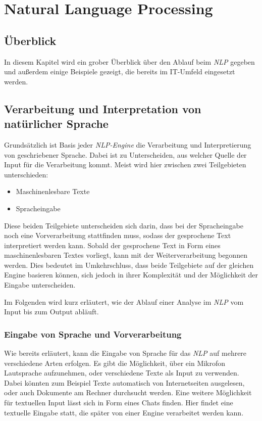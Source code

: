 \chapter{Natural Language Processing}
\label{cha:NaturalLanguageProcessing}
\section{Überblick}
In diesem Kapitel wird ein grober Überblick über den Ablauf beim \textit{NLP} gegeben und außerdem einige Beispiele gezeigt, die bereits im IT-Umfeld eingesetzt werden. 

\section{Verarbeitung und Interpretation von natürlicher Sprache}
\label{sec:applications-natural-language-processing}
Grundsätzlich ist Basis jeder \textit{NLP-Engine} die Verarbeitung und Interpretierung von geschriebener Sprache. Dabei ist zu Unterscheiden, aus welcher Quelle der Input für die Verarbeitung kommt. Meist wird hier zwischen zwei Teilgebieten unterschieden:

\begin{itemize}
	\item Maschinenlesbare Texte
	\item Spracheingabe
\end{itemize}

Diese beiden Teilgebiete unterscheiden sich darin, dass bei der Spracheingabe noch eine Vorverarbeitung stattfinden muss, sodass der gesprochene Text interpretiert werden kann. Sobald der gesprochene Text in Form eines maschinenlesbaren Textes vorliegt, kann mit der Weiterverarbeitung begonnen werden. Dies bedeutet im Umkehrschluss, dass beide Teilgebiete auf der gleichen Engine basieren können, sich jedoch in ihrer Komplexität und der Möglichkeit der Eingabe unterscheiden. 

Im Folgenden wird kurz erläutert, wie der Ablauf einer Analyse im \textit{NLP} vom Input bis zum Output abläuft. 

\subsection{Eingabe von Sprache und Vorverarbeitung}
Wie bereits erläutert, kann die Eingabe von Sprache für das \textit{NLP} auf mehrere verschiedene Arten erfolgen. Es gibt die Möglichkeit, über ein Mikrofon Lautsprache aufzunehmen, oder verschiedene Texte als Input zu verwenden. Dabei könnten zum Beispiel Texte automatisch von Internetseiten ausgelesen, oder auch Dokumente am Rechner durchsucht werden. Eine weitere Möglichkeit für textuellen Input lässt sich in Form eines Chats finden. Hier findet eine textuelle Eingabe statt, die später von einer Engine verarbeitet werden kann. 

